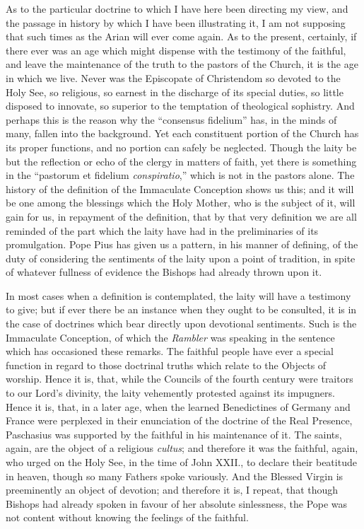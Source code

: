 As to the particular doctrine to which I have here
been directing my view, and the passage in history by which I have been
illustrating it, I am not supposing that such times as the Arian will
ever come again. As to the present, certainly, if there ever was an age
which might dispense with the testimony of the faithful, and leave the
maintenance of the truth to the pastors of the Church, it is the age in
which we live. Never was the Episcopate of Christendom so devoted to the
Holy See, so religious, so earnest in the discharge of its special
duties, so little disposed to innovate, so superior to the temptation of
theological sophistry. And perhaps this is the reason why the ``consensus
fidelium'' has, in the minds of many, fallen into the background. Yet
each constituent portion of the Church has its proper functions, and no
portion can safely be neglected. Though the laity be but the reflection
or echo of the clergy in matters of faith, yet there is something in the
``pastorum et fidelium \emph{conspiratio},'' which is not in the pastors
alone. The history of the definition of the Immaculate Conception shows
us this; and it will be one among the blessings which the Holy Mother,
who is the subject of it, will gain for us, in repayment of the
definition, that by that very definition we are all reminded of the part
which the laity have had in the preliminaries of its promulgation. Pope
Pius has given us a pattern, in his manner of defining, of the duty of
considering the sentiments of the laity upon a point of tradition, in
spite of whatever fullness of evidence the Bishops had already
thrown upon it.

In most cases when a definition is contemplated,
the laity will have a testimony to give; but if ever there be an
instance when they ought to be consulted, it is in the case of doctrines
which bear directly upon devotional sentiments. Such is the Immaculate
Conception, of which the \emph{Rambler} was speaking in the sentence
which has occasioned these remarks. The faithful people have ever a
special function in regard to those doctrinal truths which relate to the
Objects of worship. Hence it is, that, while the Councils of the fourth
century were traitors to our Lord's divinity, the laity vehemently
protested against its impugners. Hence it is, that, in a later age, when
the learned Benedictines of Germany and France were perplexed in their
enunciation of the doctrine of the Real Presence, Paschasius was
supported by the faithful in his maintenance of it. The saints, again,
are the object of a religious \emph{cultus}; and therefore it was the
faithful, again, who urged on the Holy See, in the time of John XXII.,
to declare their beatitude in heaven, though so many Fathers spoke
variously. And the Blessed Virgin is preeminently an object of devotion;
and therefore it is, I repeat, that though Bishops had already spoken in
favour of her absolute sinlessness, the Pope was not content without
knowing the feelings of the faithful.

